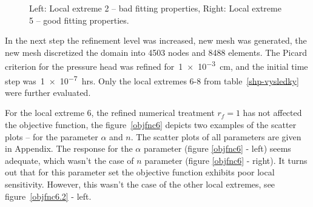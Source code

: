\documentclass[review]{elsarticle}
\begin{document}
\begin{figure}
\caption{Left: Local extreme 2 -- bad fitting properties, Right: Local extreme 5 -- good fitting properties.}
\label{rf0samples}
\end{figure}

In the next step the refinement level was increased, new mesh was generated, the new mesh discretized the domain into 4503 nodes and 8488 elements. The Picard criterion for the pressure head was refined for~\num{1e-3}~cm, and the initial time step was~\num{1e-7}~hrs. Only the local extremes 6-8 from table~\ref{shp-vysledky} were further evaluated.

For the local extreme 6, the refined numerical treatment $r_f=1$ has not affected the objective function, the figure~\ref{objfnc6} depicts two examples of the scatter plots -- for the parameter $\alpha$ and $n$. The scatter plots of all parameters are given in Appendix. The response for the $\alpha$ parameter (figure \ref{objfnc6} - left) seems adequate, which wasn't the case of $n$ parameter  (figure \ref{objfnc6} - right). It turns out that for this parameter set the objective function exhibits poor local sensitivity. However, this wasn't the case of the other local extremes, see figure~\ref{objfnc6.2} - left. 
\end{document}
